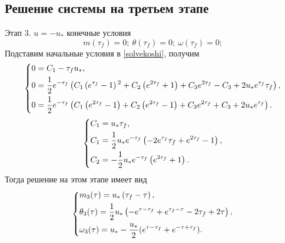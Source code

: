 \documentclass[a4paper,12pt, openany]{book}
\theoremstyle{plain} %
\theoremstyle{definition} %
\theoremstyle{remark} %
\numberwithin{equation}{chapter}
\begin{document}
{\subsection{Решение системы на третьем этапе}
Этап 3. $u=-u_*$ конечные условия
\[
    m(\tau_f)=0; \ \theta(\tau_f)=0;\ \omega(\tau_f)=0;
\]
Подставим начальные условия в \eqref{solvekoshi}, получим
\[
    \left\{ {\begin{aligned}
                 & 0 = C_1-\tau_f  u_*, \hfill                                               \\
                 & 0 = \frac{1}{2} e^{-\tau _f} \left(C_1 \left(e^{\tau _f}-1\right){}^2+C_2
                \left(e^{2 \tau _f}+1\right)+C_3 e^{2 \tau _f}-C_3+2 u_* e^{\tau _f} \tau
                _f\right), \hfill                                                            \\
                 & 0 = \frac{1}{2} e^{-\tau _f} \left(C_1 \left(e^{2 \tau _f}-1\right)+C_2
                \left(e^{2 \tau _f}-1\right)+C_3 e^{2 \tau _f}+C_3+2 u_* e^{\tau
                _f}\right)  . \hfill                                                         \\
            \end{aligned}} \right.
\]
\[
    \left\{ {\begin{aligned}
                 & C_1 = u_* \tau _f, \hfill                                                  \\
                 & C_1 = \frac{1}{2} u_* e^{-\tau _f} \left(-2 e^{\tau _f} \tau _f+e^{2 \tau
                _f}-1\right), \hfill                                                          \\
                 & C_2 = -\frac{1}{2} u_* e^{-\tau _f} \left(e^{2 \tau _f}+1\right)  . \hfill \\
            \end{aligned}} \right.
\]
Тогда решение на этом этапе имеет вид
\[
    \left\{ {\begin{aligned}
                 & m_3(\tau) = u_* \left(\tau _f-\tau \right), \hfill                                           \\
                 & \theta_3(\tau) = \frac{1}{2} u_* \left(-e^{\tau -\tau _f}+e^{\tau _f-\tau }-2 \tau _f+2 \tau
                \right), \hfill                                                                                 \\
                 & \omega_3(\tau) =u_*-\frac{u_*}{2}(e^{\tau-\tau_f}+e^{-\tau+\tau_f}) . \hfill                 \\
            \end{aligned}} \right.
\]

}
\end{document}
